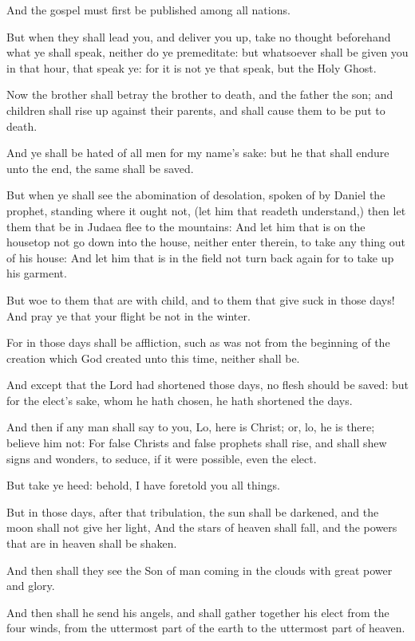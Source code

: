 \Verse And the gospel must first be published among all nations.

\Verse But when they shall lead you, and deliver you up, take no thought beforehand what ye shall speak, neither do ye premeditate: but whatsoever shall be given you in that hour, that speak ye: for it is not ye that speak, but the Holy Ghost.

\Verse Now the brother shall betray the brother to death, and the father the son; and children shall rise up against their parents, and shall cause them to be put to death.

\Verse And ye shall be hated of all men for my name's sake: but he that shall endure unto the end, the same shall be saved.

\Verse But when ye shall see the abomination of desolation, spoken of by Daniel the prophet, standing where it ought not, (let him that readeth understand,) then let them that be in Judaea flee to the mountains: \Verse And let him that is on the housetop not go down into the house, neither enter therein, to take any thing out of his house: \Verse And let him that is in the field not turn back again for to take up his garment.

\Verse But woe to them that are with child, and to them that give suck in those days!  \Verse And pray ye that your flight be not in the winter.

\Verse For in those days shall be affliction, such as was not from the beginning of the creation which God created unto this time, neither shall be.

\Verse And except that the Lord had shortened those days, no flesh should be saved: but for the elect's sake, whom he hath chosen, he hath shortened the days.

\Verse And then if any man shall say to you, Lo, here is Christ; or, lo, he is there; believe him not: \Verse For false Christs and false prophets shall rise, and shall shew signs and wonders, to seduce, if it were possible, even the elect.

\Verse But take ye heed: behold, I have foretold you all things.

\Verse But in those days, after that tribulation, the sun shall be darkened, and the moon shall not give her light, \Verse And the stars of heaven shall fall, and the powers that are in heaven shall be shaken.

\Verse And then shall they see the Son of man coming in the clouds with great power and glory.

\Verse And then shall he send his angels, and shall gather together his elect from the four winds, from the uttermost part of the earth to the uttermost part of heaven.

